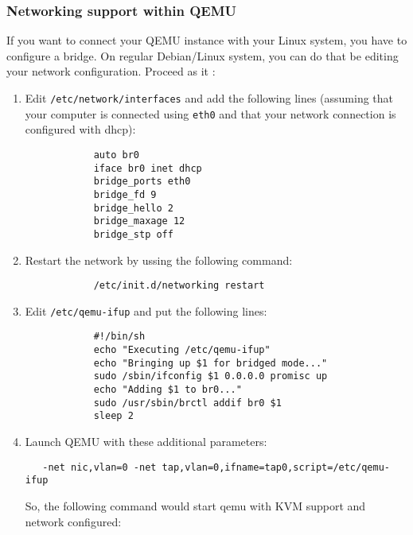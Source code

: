 \documentclass[11pt]{book}
\begin{document}
         \subsubsection{Networking support within QEMU}
         If you want to connect your QEMU instance with your Linux system,
         you have to configure a bridge. On regular Debian/Linux system,
         you can do that be editing your network configuration. Proceed
         as it :
         \begin{enumerate}
            \item
            Edit \texttt{/etc/network/interfaces} and add the following lines 
            (assuming that your computer is connected using \texttt{eth0} and
            that your network connection is configured with dhcp):
            \begin{verbatim}
            auto br0
            iface br0 inet dhcp
            bridge_ports eth0
            bridge_fd 9
            bridge_hello 2
            bridge_maxage 12
            bridge_stp off
            \end{verbatim}

            \item
            Restart the network by ussing the following command:
            \begin{verbatim}
            /etc/init.d/networking restart
            \end{verbatim}
         
            \item
            Edit \texttt{/etc/qemu-ifup} and put the following lines:
            \begin{verbatim}
            #!/bin/sh
            echo "Executing /etc/qemu-ifup"
            echo "Bringing up $1 for bridged mode..."
            sudo /sbin/ifconfig $1 0.0.0.0 promisc up
            echo "Adding $1 to br0..."
            sudo /usr/sbin/brctl addif br0 $1
            sleep 2
            \end{verbatim}

            \item
            Launch QEMU with these additional parameters:
            \begin{verbatim}
   -net nic,vlan=0 -net tap,vlan=0,ifname=tap0,script=/etc/qemu-ifup
            \end{verbatim}

            So, the following command would start qemu with KVM
            support and network configured:


\end{enumerate}
\end{document}
